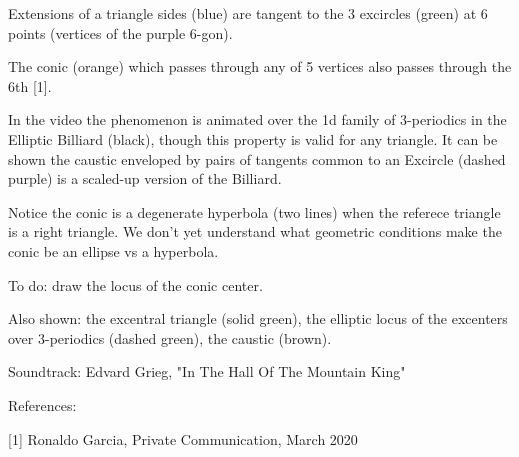 Extensions of a triangle sides (blue) are tangent to the 3 excircles (green) at 6 points (vertices of the purple 6-gon).

The conic (orange) which passes through any of 5 vertices also passes through the 6th [1].

In the video the phenomenon is animated over the 1d family of 3-periodics in the Elliptic Billiard (black), though this property is valid for any triangle.  It can be shown the caustic enveloped by pairs of tangents common to an Excircle (dashed purple) is a scaled-up version of the Billiard.

Notice the conic is a degenerate hyperbola (two lines) when the referece triangle is a right triangle. We don't yet understand what geometric conditions make the conic be an ellipse vs a hyperbola.

To do: draw the locus of the conic center.

Also shown: the excentral triangle (solid green), the elliptic locus of the excenters over 3-periodics (dashed green), the caustic (brown).

Soundtrack: Edvard Grieg, "In The Hall Of The Mountain King"

References:

[1] Ronaldo Garcia, Private Communication, March 2020